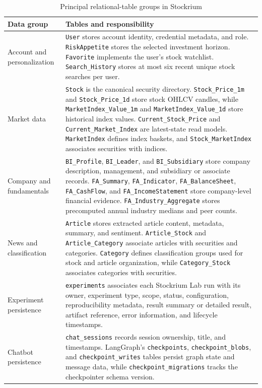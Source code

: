 \begin{table}[H]
    \centering
    \caption{Principal relational-table groups in Stockrium}
    \label{tab:supabase-table-groups}
    \footnotesize
    \setlength{\tabcolsep}{5pt}
    \renewcommand{\arraystretch}{1.2}
    \begin{tabular}{p{3.0cm} p{9.8cm}}
        \toprule
        \textbf{Data group} & \textbf{Tables and responsibility} \\
        \midrule
        Account and personalization & \texttt{User} stores account identity, credential metadata, and role. \texttt{RiskAppetite} stores the selected investment horizon. \texttt{Favorite} implements the user's stock watchlist. \texttt{Search\_History} stores at most six recent unique stock searches per user. \\
        Market data & \texttt{Stock} is the canonical security directory. \texttt{Stock\_Price\_1m} and \texttt{Stock\_Price\_1d} store stock OHLCV candles, while \texttt{MarketIndex\_Value\_1m} and \texttt{MarketIndex\_Value\_1d} store historical index values. \texttt{Current\_Stock\_Price} and \texttt{Current\_Market\_Index} are latest-state read models. \texttt{MarketIndex} defines index baskets, and \texttt{Stock\_MarketIndex} associates securities with indices. \\
        Company and fundamentals & \texttt{BI\_Profile}, \texttt{BI\_Leader}, and \texttt{BI\_Subsidiary} store company description, management, and subsidiary or associate records. \texttt{FA\_Summary}, \texttt{FA\_Indicator}, \texttt{FA\_BalanceSheet}, \texttt{FA\_CashFlow}, and \texttt{FA\_IncomeStatement} store company-level financial evidence. \texttt{FA\_Industry\_Aggregate} stores precomputed annual industry medians and peer counts. \\
        News and classification & \texttt{Article} stores extracted article content, metadata, summary, and sentiment. \texttt{Article\_Stock} and \texttt{Article\_Category} associate articles with securities and categories. \texttt{Category} defines classification groups used for stock and article organization, while \texttt{Category\_Stock} associates categories with securities. \\
        Experiment persistence & \texttt{experiments} associates each Stockrium Lab run with its owner, experiment type, scope, status, configuration, reproducibility metadata, result summary or detailed result, artifact reference, error information, and lifecycle timestamps. \\
        Chatbot persistence & \texttt{chat\_sessions} records session ownership, title, and timestamps. LangGraph's \texttt{checkpoints}, \texttt{checkpoint\_blobs}, and \texttt{checkpoint\_writes} tables persist graph state and message data, while \texttt{checkpoint\_migrations} tracks the checkpointer schema version. \\
        \bottomrule
    \end{tabular}
\end{table}

